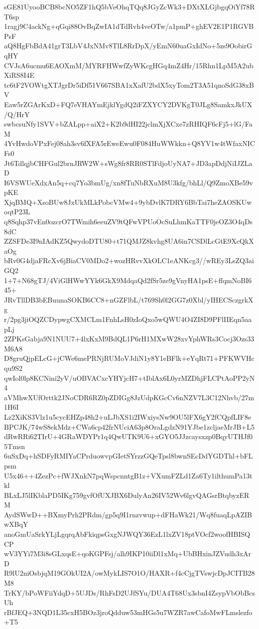 sGE81UyooBCB8bcNO5ZF1hQ5bVeOhqTQq8JGyZcWk3+DXtXLGjbgqOiYf78RT6sp
1ragj9C4ackNg+qGqi88OvBqZwIA1dTdRvh4veOTw/a1pmP+ghEV2E1P1RGVBPsF
aQ8HgFbBdA41grT3LbV4JxNMv8TlL8RrDpX/yEmN60uaGxIdNo+5zs9OobirGqHY
CVJsA6ucmu6EAOXmM/MYRFHWwfZyWKcgHGq4mZ4Hr/15Rhn1LpM5A2ubXiRS8I4E
tc6tF2VOWtgXTJgrDr5iDf51V667SBA1xXafU2bdX5xyTom2T3A51qnoSdG38xBV
Eaw5rZGArKxD+FQ7eVHAYmEjklYgdQ2iFZXYCY2DVKgT0JLg8SamkxJkUX/Q/HrY
swbcsuNfy1SVV+bZALpp+aiX2+K2b9dHI22jclmXjXCxe7zRHIQF6cFj5+lG/FaM
4YvHwdoVPxFej08ah3sv6fXFA5rEweEwu0F084HuWWkkn+Q8YV1w4tWfaxNICFs0
Jt6TdlqjbCHFGul2brnJRW2W+sWg8fr8RR0STlFdjoUyNA7+JD3apDdjNiIJZLaD
I6VSWUeXdxAn5q+cq7Yo3bmUg/xn8fTuNbRXuM8U3kfg/bhLl/Q9ZmoXBe59vpKE
XjqBMQ+XsoBUw8JxUkMLkPobcVMw4+9ybDvlK7DRY6BbTai7heZAOSKUwoqtP23L
q8Sqhp37vEn0ozcrO7TWmih6eeuZV9tQFwVPUoOcSuLhmKaTTF0jeOZ3O4qDs8dC
ZZSFDe3I9nIAdKZ5QwydoDTU80+t71QMJZ8kvhg8UA6in7CSDlLcGtE9XcQkXaOg
bRv0G4djaFRcXv6jBiaCV0MDo2+wozHRvvXkOLC1eANKcg3//wREy3LsZQ3aiGQ2
1+7+N68gTJ/4ViGlHWwYYk6GkX9MdqaQd2fSr5ze9gVnyHA1psE+ffqmNoBI645+
JRvTllDB3bEBuunaSOKB6CC8+nGZFlbL/t769Sh0l2GG7z0Xbl/yIHECSczgrkXg
r/2pg3jiOQZCDypwgCXMCLm1FnhLsH0zIoQxo5wQWU4O4ZI8D9PFlIIEqn5aapLj
2ZPKsGabja9N1NUU7+4lxKxM9BdQL1P6rH1MXwW28xvYphWRs3Cocj3Ozs33M6A8
D8gruQjpELcG+jCWe6mePRNjRUMoVJdiN1y8Y1eBFlk+eYqRt71+PFKWVHcqu9S2
qwIol0lp8KCNini2yV/uOBVACxcYHYjcH7+tIblAx6L0yrMZDhjFLCPtAoPP2yN4
aVMhwXUfOrttk2JNoCDR6RZ0pZDIGg8JzUdpKGcCv6nNZV7L3C12Nhvb/27m1H6I
Lz2XiKS3Vlz1u5cycEHZp48h2+uLJbXS1i2IWxiysNw9OU5lFX6gY2fCQpfLIF8e
BPCJK/74wS8ekMdz+CWa6cp42frNUciA63p8OraLgdzN91YJbe1zcljaeMrJB+L5
dRwRRi62TIrU+4GRaWDYPr1q4QwUTK9U6+xGYO5JJzcaysxzp0BqyUTHJf05Tmsn
6uSxDq+hSDFyRMIYaCPrduowvpGIetSYrzzGQeTpsl8bwnSEcDdYGDThl+bFLpsm
U5x46++4ZezPc+fWJXnkN7pqWspcnntgB1z+VXumFZLd1Za6Ty1ilthumPa13tkl
BLxLJ5lIKblaPD5IKg759gvfOfUXJBX6DulyAn26IV52Wv6lgvQAGsrBtqbyzERM
AydSWwD++BXmyPrh2PRdm/gp5q9I1rnzvwup+dFHaWk21/Wq8fuaqLpAZIBwXBqY
anoGmUaSrkYLjLgqrqAbFkiqpsGxgNJWQY36EzL1lxZV18ptVOcf2woofHBISQCP
wV3YYi7M3i8sGLxqsE+qoKGPFsj/alh9IKP10iiDl1xMq+UbBHxinJZVudh3xArD
R9lU2niOsbjqM19GOkUI2A/owMykLIS7O1O/HAXR+f4cCjgTVswjcDpJCITB28M8
TrKY/bPoWFiiYdqD+5UJDs/RhFsD2UJfSYu/DUA4T68Ux3sbnI4ZsypVbObBcsUh
rBfJEQ+3NQD1L35cxH5BOz3jroQdduw53mHGs5u7WZR7awCafoMwFLmslezfo+T5
